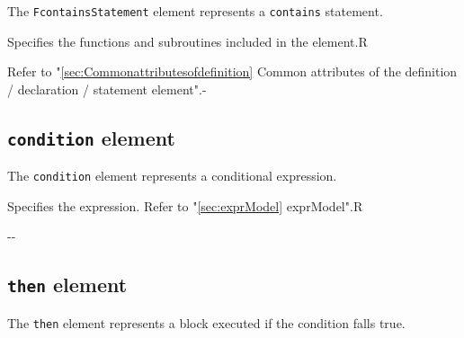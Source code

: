 The {\tt FcontainsStatement} element represents a {\tt contains} statement.


\begin{XcodeMLChildElements}
{Specifies the functions and subroutines included in the element.}{R}
\end{XcodeMLChildElements}

\begin{XcodeMLAttributes}
{Refer to "\ref{sec:Commonattributesofdefinition} Common attributes of the definition / declaration / statement element".}{-}
\end{XcodeMLAttributes}


\subsection{ {\tt condition} element}

The {\tt condition} element represents a conditional expression.


\begin{XcodeMLChildElements}
{Specifies the expression. Refer to "\ref{sec:exprModel} exprModel".}{R}
\end{XcodeMLChildElements}

\begin{XcodeMLAttributes}
\XcodeMLAttrDef{-}{-}
{-}{-}
\end{XcodeMLAttributes}


\subsection{ {\tt then} element}

The {\tt then} element represents a block executed if the condition falls true.


